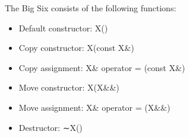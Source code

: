 The Big Six consists of the following functions:

\begin{itemize}
\item 
Default constructor: X()

\item 
Copy constructor: X(const X\&)

\item 
Copy assignment: X\& operator = (const X\&)

\item 
Move constructor: X(X\&\&)

\item 
Move assignment: X\& operator = (X\&\&)

\item 
Destructor: ∼X()
\end{itemize}
